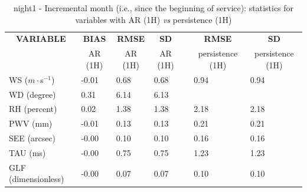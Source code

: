 \begin{table}[]
\begin{center}
\begin{tabular}{|l|l|l|l|l|l|l|}
\hline
\multicolumn{1}{|c|}{\cellcolor[HTML]{C0C0C0}\textbf{VARIABLE}} & \multicolumn{1}{c|}{\cellcolor[HTML]{C0C0C0}\textbf{BIAS}} & \multicolumn{1}{c|}{\cellcolor[HTML]{C0C0C0}\textbf{RMSE}} & \multicolumn{1}{c|}{\cellcolor[HTML]{C0C0C0}\textbf{SD}} & & \multicolumn{1}{c|}{\cellcolor[HTML]{C0C0C0}\textbf{RMSE}} & \multicolumn{1}{c|}{\cellcolor[HTML]{C0C0C0}\textbf{SD}}\\
\multicolumn{1}{|c|}{\cellcolor[HTML]{C0C0C0}} & \multicolumn{1}{c|}{\cellcolor[HTML]{C0C0C0}AR (1H)} & \multicolumn{1}{c|}{\cellcolor[HTML]{C0C0C0}AR (1H)} & \multicolumn{1}{c|}{\cellcolor[HTML]{C0C0C0}AR (1H)} & & \multicolumn{1}{c|}{\cellcolor[HTML]{C0C0C0} persistence (1H)} & \multicolumn{1}{c|}{\cellcolor[HTML]{C0C0C0}persistence (1H)}\\\hline
\cellcolor[HTML]{C0C0C0}WS ($m\cdot$s$^{-1}$) &     -0.01  &      0.68  &      0.68  & &      0.94  &      0.94\\
\cellcolor[HTML]{C0C0C0}WD (degree)           &      0.31  &      6.14  &      6.13  & &   & \\
\cellcolor[HTML]{C0C0C0}RH (percent)          &      0.02  &      1.38  &      1.38  & &      2.18  &      2.18\\
\cellcolor[HTML]{C0C0C0}PWV (mm)              &     -0.01 &      0.13 &      0.13 & &      0.21 &      0.21\\
\cellcolor[HTML]{C0C0C0}SEE (arcsec)          &     -0.00 &      0.10 &      0.10 & &      0.16 &      0.16\\
\cellcolor[HTML]{C0C0C0}TAU (ms)              &     -0.00 &      0.75 &      0.75 & &      1.23 &      1.23\\
\cellcolor[HTML]{C0C0C0}GLF (dimensionless)   &     -0.00 &      0.07 &      0.07 & &      0.10 &      0.10\\
\hline
\end{tabular}
\caption{night1 - Incremental month (i.e., since the beginning of service): statistics for variables with AR (1H) \textit{vs} persistence (1H)}\label{tab:night1:statAFT:IM}
\end{center}
\end{table}

\clearpage
